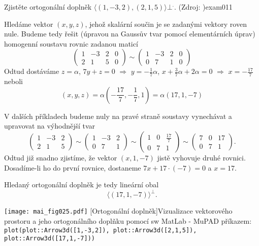 \begin{mathexam}{Zjistěte ortogonální doplněk \(\langle(1,-3,2),(2,1,5)\rangle\bot^.\). (Zdroj:
  \cite[s.~3]{MosnaMA3})}{exam011} 
  
  Hledáme vektor \((x, y, z)\), jehož skalární součin je se zadanými vektory roven nule. Budeme tedy
  řešit (úpravou na Gaussův tvar pomocí elementárních úprav) homogenní soustavu rovnic zadanou
  maticí
  \begin{equation*}
    \left(
      \begin{array}{ccc|c}
          1  &  -3  & 2 & 0 \\
          2  &   1  & 5 & 0
      \end{array}
    \right)\sim
    \left(
      \begin{array}{ccc|c}
          1  &  -3  & 2 & 0 \\
          0  &   7  & 1 & 0
      \end{array}
    \right)
  \end{equation*}
  Odtud dostáváme \(z = \alpha\), \(7y + z = 0\) \(\Rightarrow\) \(y = -\frac{1}{7}\alpha\), \(x
  +\frac{3}{7}\alpha + 2\alpha = 0\) \(\Rightarrow\) \(x = -\frac{17}{7}\) neboli 
  \begin{equation*}
  (x, y, z) =\alpha\left(-\frac{17}{7}, -\frac{1}{7}, 1\right) = \alpha(17, 1, -7)
  \end{equation*}

  V dalších příkladech budeme nuly na pravé straně soustavy vynechávat a upravovat na výhodnější
  tvar
  \begin{equation*}
    \begin{pmatrix}
        1  &  -3  & 2  \\
        2  &   1  & 5
    \end{pmatrix}
    \sim
    \begin{pmatrix}
        1  &  -3  & 2 \\
        0  &   7  & 1
    \end{pmatrix}
    \sim
    \begin{pmatrix}
        1  &   0  & \frac{17}{7}  \\
        0  &   7  & 1
    \end{pmatrix}
    \sim
    \begin{pmatrix}
        7  &   0  & 17 \\
        0  &   7  & 1
    \end{pmatrix}.
  \end{equation*}
  Odtud již snadno zjistíme, že vektor \((x, 1, -7)\) jistě vyhovuje druhé rovnici. Dosadíme-li ho
  do první rovnice, dostaneme \(7x + 17\cdot(-7) = 0\) a \(x = 17\).

  Hledaný ortogonální doplněk je tedy lineární obal $$\langle(17, 1, -7)\rangle^\bot.$$
  
  {\centering
  \captionsetup{type=figure}
  \texttt{[image: mai\_fig025.pdf]}
  [Ortogonální doplněk]{Vizualizace vektorového prostoru a jeho ortogonálního
          doplňku pomocí sw MatLab - MuPAD příkazem: \texttt{plot(plot::Arrow3d([1,-3,2]),
          plot::Arrow3d([2,1,5]), plot::Arrow3d([17,1,-7]))}}
  \label{LA:fig_ort01}
  \par}
\end{mathexam}
